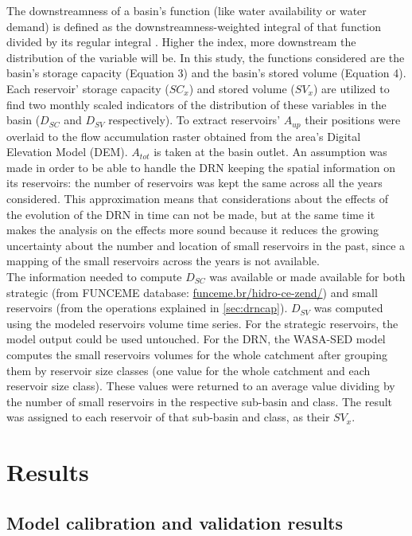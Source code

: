 \documentclass[draft]{agujournal2019}
\begin{document}
The downstreamness of a basin’s function (like water availability or water demand) is defined as the downstreamness-weighted integral of that function divided by its regular integral \cite{VanOel2011}. Higher the index, more downstream the distribution of the variable will be. In this study, the functions considered are the basin’s storage capacity (Equation 3) and the basin’s stored volume (Equation 4). Each reservoir’ storage capacity ($SC_{x}$) and stored volume ($SV_{x}$) are utilized to find two monthly scaled indicators of the distribution of these variables in the basin ($D_{SC}$ and $D_{SV}$ respectively). To extract reservoirs’ $A_{up}$ their positions were overlaid to the flow accumulation raster obtained from the area’s Digital Elevation Model (DEM). $A_{tot}$ is taken at the basin outlet.  An assumption was made in order to be able to handle the DRN keeping the spatial information on its reservoirs: the number of reservoirs was kept the same across all the years considered. This approximation means that considerations about the effects of the evolution of the DRN in time can not be made, but at the same time it makes the analysis on the effects more sound because it reduces the growing uncertainty about the number and location of small reservoirs in the past, since a mapping of the small reservoirs across the years is not available.\\
The information needed to compute $D_{SC}$ was available or made available for both strategic (from FUNCEME database: \url{funceme.br/hidro-ce-zend/}) and small reservoirs (from the operations explained in \ref{sec:drncap}). $D_{SV}$ was computed using the modeled reservoirs volume time series. For the strategic reservoirs, the model output could be used untouched. For the DRN, the WASA-SED model computes the small reservoirs volumes for the whole catchment after grouping them by reservoir size classes (one value for the whole catchment and each reservoir size class). These values were returned to an average value dividing by the number of small reservoirs in the respective sub-basin and class. The result was assigned to each reservoir of that sub-basin and class, as their $SV_{x}$.

\section{Results}
\subsection{Model calibration and validation results}
\end{document}
